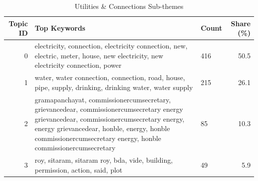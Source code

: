 \begin{table}[htbp]
\centering
\caption{Utilities \& Connections Sub-themes}
\label{tab:topics_Utilities_Connections}
\begin{tabular}{rlp{7cm}r}
\toprule
Topic ID & Top Keywords & Count & Share (\%) \\
\midrule
0 & electricity, connection, electricity connection, new, electric, meter, house, new electricity, new electricity connection, power & 416 & 50.5 \\
1 & water, water connection, connection, road, house, pipe, supply, drinking, drinking water, water supply & 215 & 26.1 \\
2 & gramapanchayat, commissionercumsecretary, grievancedear, commissionercumsecretary energy grievancedear, commissionercumsecretary energy, energy grievancedear, honble, energy, honble commissionercumsecretary energy, honble commissionercumsecretary & 85 & 10.3 \\
3 & roy, sitaram, sitaram roy, bda, vide, building, permission, action, said, plot & 49 & 5.9 \\
\bottomrule
\end{tabular}
\end{table}
